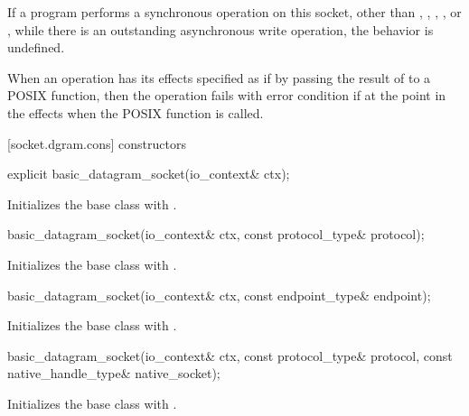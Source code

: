 \pnum
If a program performs a synchronous operation on this socket, other than , , , , or , while there is an outstanding asynchronous write operation, the behavior is undefined.

\pnum
When an operation has its effects specified as if by passing the result of  to a POSIX function, then the operation fails with error condition  if  at the point in the effects when the POSIX function is called.


[socket.dgram.cons]{ constructors}

\begin{itemdecl}
explicit basic_datagram_socket(io_context& ctx);
\end{itemdecl}

\begin{itemdescr}
\pnum
\effects Initializes the base class with .
\end{itemdescr}

\begin{itemdecl}
basic_datagram_socket(io_context& ctx, const protocol_type& protocol);
\end{itemdecl}

\begin{itemdescr}
\pnum
\effects Initializes the base class with .
\end{itemdescr}

\begin{itemdecl}
basic_datagram_socket(io_context& ctx, const endpoint_type& endpoint);
\end{itemdecl}

\begin{itemdescr}
\pnum
\effects Initializes the base class with .
\end{itemdescr}

\begin{itemdecl}
basic_datagram_socket(io_context& ctx, const protocol_type& protocol,
                      const native_handle_type& native_socket);
\end{itemdecl}

\begin{itemdescr}
\pnum
\effects Initializes the base class with .
\end{itemdescr}

